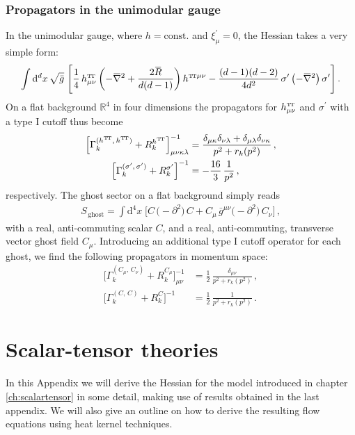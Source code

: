 \documentclass[11pt]{book}
\newcommand{\overbar}[1]{\mkern 1.5mu\overline{\mkern-1.5mu#1\mkern-1.5mu}\mkern 1.5mu}
\newcommand\TTspace{ -1pt }
\newcommand\TT{ \scriptscriptstyle{\mathrm{T\hspace{\TTspace}T}} }
\newcommand\hTTmunu{ h^{\scriptscriptstyle{\mathrm{T\hspace{\TTspace}T}}}_{\mu\nu} }
\newcommand{\bnabla}{\overbar \nabla}
\newcommand{\bR}{\overbar R}
\numberwithin{equation}{chapter}
\begin{document}
\begin{appendices}
\subsection{Propagators in the unimodular gauge}

In the unimodular gauge, where $h=\mathrm{const.}$ and $\xi^\prime_\mu=0$,
the Hessian takes a very simple form:
\begin{align}
  \int \mathrm d^dx \, \sqrt{\bar g} \;
  \Biggl[
    \frac{1}{4} \, \hTTmunu
    \left(
      -\bnabla^2 + \frac{2\bR}{d(d-1)}
    \right)
    h^{{\TT} \mu\nu}
    - \frac{(d-1)(d-2)}{4d^2} \, \sigma'
    \left( -\bnabla^2 \right)
    \sigma'
  \Biggl] \,.
\end{align}
On a flat background $\mathbb R^4$ in four dimensions the propagators
for $\hTTmunu$ and $\sigma^\prime$
with a type I cutoff
thus become
\begin{align}
  \Big[ \Gamma_k^{(h^{\TT},\,h^{\TT})}+R_k^{h^{\TT}} \Big]^{-1}_{\mu \nu \kappa \lambda}
  &= \frac{ \delta_{\mu \kappa} \delta_{\nu \lambda} + \delta_{\mu\lambda} \delta_{\nu\kappa} }{ p^2 + r_k(p^2) } \,, \\
  \Big[ \Gamma_k^{(\sigma^\prime,\,\sigma^\prime)} + R_k^{\sigma^\prime} \Big]^{-1}
  &= - \frac{16}{3} \, \frac{1}{p^2} \,,
\end{align}
respectively. The ghost sector on a flat background simply reads
\begin{align}
  S_{\,\mathrm{ghost}}
  = \int \mathrm d^4x \;
  \Big[
    C \, \big( -\partial^2 \big) \, C
    +  C_\mu \, \bar g^{\mu\nu}
    \big( -\partial^2 \big) \, C_\nu
  \Big] \,,
\end{align}
with a real, anti-commuting scalar $C$,
and a real, anti-commuting, transverse vector ghost field $C_\mu$.
Introducing an additional type I cutoff operator for each ghost,
we find the following propagators in momentum space:
\begin{align}
  \Big[ \Gamma_k^{(C_\mu,\,C_\nu)}+R_k^{C_\mu} \Big]^{-1}_{\mu \nu}
  &= \frac 12 \, \frac{ \delta_{\mu \nu} }{ p^2 + r_k(p^2) } \,, \\
  \Big[ \Gamma_k^{(C,\,C)} + R_k^{C} \Big]^{-1}
  &= \frac{1}{2} \, \frac{1}{ p^2 + r_k(p^2) } \,.
\end{align}


\chapter{Scalar-tensor theories}
\label{app:Hessian}

In this Appendix we will derive the Hessian for the model introduced
in chapter \ref{ch:scalartensor} in some detail,
making use of results obtained in the last appendix. We will also give
an outline on how to derive the resulting flow equations using
heat kernel techniques.


\end{appendices}
\end{document}
